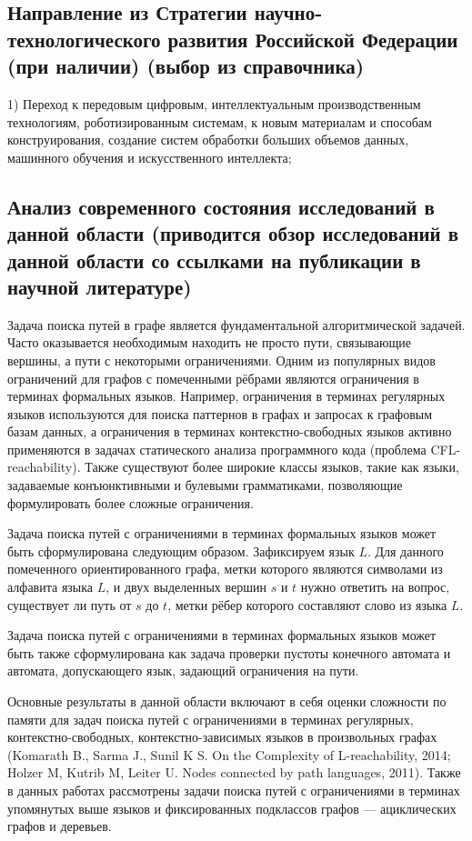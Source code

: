 \documentclass[12pt]{article}  %
\theoremstyle{remark}
\begin{document}
\subsection{Направление из Стратегии научно-технологического развития Российской Федерации (при наличии) (выбор из справочника)}
1) Переход к передовым цифровым, интеллектуальным производственным технологиям, роботизированным системам, к новым материалам и способам конструирования, создание систем обработки больших объемов данных, машинного обучения и искусственного интеллекта;
\subsection{Анализ современного состояния исследований в данной области (приводится обзор исследований в данной области со ссылками на публикации в научной литературе)}
Задача поиска путей в графе является фундаментальной алгоритмической задачей. Часто оказывается необходимым находить не просто пути, связывающие вершины, а пути с некоторыми ограничениями. Одним из популярных видов ограничений для графов с помеченными рёбрами являются ограничения в терминах формальных языков. Например, ограничения в терминах регулярных языков используются для поиска паттернов в графах и запросах к графовым базам данных, а ограничения в терминах контекстно-свободных языков активно применяются в задачах статического анализа программного кода (проблема CFL-reachability). Также существуют более широкие классы языков, такие как языки, задаваемые конъюнктивными и булевыми грамматиками, позволяющие формулировать более сложные ограничения. 


Задача поиска путей с ограничениями в терминах формальных языков может быть сформулирована следующим образом. Зафиксируем язык $L$. Для данного помеченного ориентированного графа, метки которого являются символами из алфавита языка $L$, и двух выделенных вершин $s$ и $t$ нужно ответить на вопрос, существует ли путь от  $s$ до $t$, метки рёбер которого составляют слово из языка $L$.

Задача поиска путей с ограничениями в терминах формальных языков может быть также сформулирована как задача проверки пустоты конечного автомата и автомата, допускающего язык, задающий ограничения на пути.

Основные результаты в данной области включают в себя оценки сложности по памяти для задач поиска путей с ограничениями в терминах регулярных, контекстно-свободных, контекстно-зависимых языков в произвольных графах (Komarath B., Sarma J., Sunil K S. On the Complexity of L-reachability, 2014; Holzer M, Kutrib M, Leiter U. Nodes connected by path languages, 2011). Также в данных работах рассмотрены задачи поиска путей с ограничениями в терминах упомянутых выше языков и фиксированных подклассов графов ---  ациклических графов и деревьев. 
\end{document}
